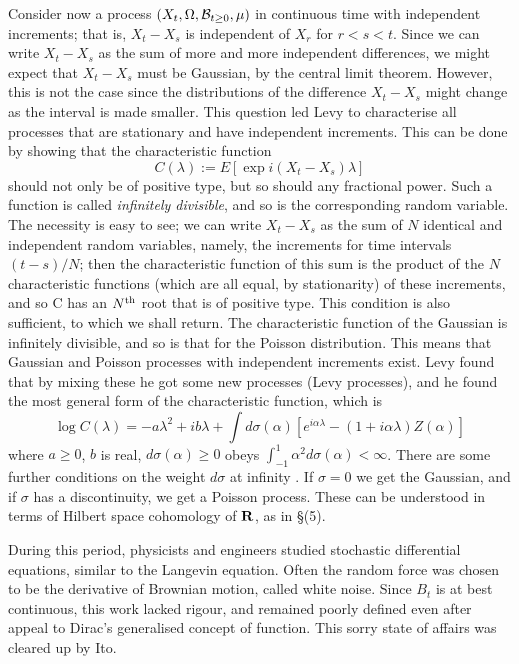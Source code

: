 Consider now a process $(X_t,\Omega,{\cal B}_{t\geq 0},\mu)$ in continuous
time with independent increments; that is, $X_t-X_s$ is independent of
$X_r$ for $r<s<t$. Since we can write $X_t-X_s$ as the sum of more and more
independent differences, we might expect that $X_t-X_s$ must be Gaussian,
by the central limit theorem. However, this is not the case since
the distributions of the difference $X_t-X_s$ might change as the interval
is made smaller.
This question led Levy to characterise all processes that are
stationary and have independent increments. This can be done by showing
that the characteristic function
\[ C(\lambda):=E[\exp{i(X_t-X_s)\lambda}]\]
should not only be of positive type, but so should any fractional power.
Such a function is called {\em infinitely divisible}, and so is the
corresponding random variable. The necessity is easy to see; we can write
$X_t-X_s$ as the sum of $N$ identical and independent random
variables, namely, the increments for time intervals $(t-s)/N$; then the
characteristic function of this sum is the product of the $N$
characteristic functions (which are all equal, by stationarity) of
these increments, and so C has an $N^{\rm th}$ root that is of positive type.
This condition is also sufficient, to which we shall return.
The characteristic function of the Gaussian is infinitely divisible, and
so is that for the Poisson distribution. This means that Gaussian and Poisson
processes with independent increments exist. Levy found that by mixing these
he got some new processes (Levy processes), and he found
the most general form of the characteristic function, which is
\begin{equation}
\log C(\lambda)=-a\lambda^2+ib\lambda+\int d\sigma(\alpha)
[e^{i\alpha\lambda}-(1+i\alpha\lambda)Z(\alpha)]
\label{Levy}
\end{equation}
where $a\geq0$, $b$ is real, $d\sigma(\alpha)\geq0$ obeys $\int_{-1}^1
\alpha^2d\sigma(\alpha)<\infty$. There are some
further conditions on the weight $d\sigma$ at
infinity \cite{GelfandV}. If $\sigma=0$ we get the Gaussian, and if
$\sigma$ has a discontinuity, we get a Poisson process. These can be
understood in terms of Hilbert space cohomology of ${\bf R}$, as in
\S(5).

During this period, physicists and engineers studied stochastic differential
equations, similar to the Langevin equation. Often the random force was
chosen to be the derivative of Brownian motion, called white noise. Since
$B_t$ is at best continuous, this work lacked rigour, and remained
poorly defined even after appeal to Dirac's generalised concept of
function. This sorry state of affairs was cleared up by Ito.

